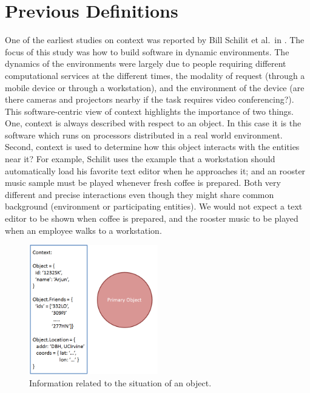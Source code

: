 \section{Previous Definitions}

One of the earliest studies on context was reported by Bill Schilit et al.\ in \cite{schilit1994context}. The focus of this study was how to build software in dynamic environments. The dynamics of the environments were largely due to people requiring different computational services at the different times, the modality of request (through a mobile device or through a workstation), and the environment of the device (are there cameras and projectors nearby if the task requires video conferencing?). This software-centric view of context highlights the importance of two things. One, context is always described with respect to an object. In this case it is the software which runs on processors distributed in a real world environment. Second, context is used to determine how this object interacts with the entities near it? For example, Schilit uses the example that a workstation should automatically load his favorite text editor when he approaches it; and an rooster music sample must be played whenever fresh coffee is prepared. Both very different and precise interactions even though they might share common background (environment or participating entities). We would not expect a text editor to be shown when coffee is prepared, and the rooster music to be played when an employee walks to a workstation.

\begin{figure}[t]
\centering
\includegraphics[width=0.5\textwidth]{media/chapter2/dey-def.png}
\caption{Information related to the situation of an object.}
\label{fig:anind-def}
\end{figure}

